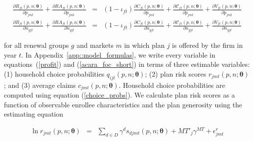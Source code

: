 \documentclass[12pt]{article}
\begin{document}
\vspace{-0.4in}	
\begin{footnotesize}

	\begin{eqnarray}\label{acara_foc_short}
	\frac{\partial R_{ft}(\textit{p},\textit{n};\boldsymbol{\theta})}{\partial p_{jmt}} + \frac{\partial RA_{ft}(\textit{p},\textit{n};\boldsymbol{\theta})}{\partial p_{jmt}} &=& (1-\iota_{ft}) \frac{\partial C_{ft}(\textit{p},\textit{n};\boldsymbol{\theta})}{\partial p_{jmt}} + \frac{\partial \mathcal{C}_{ft}(\textit{p},\textit{n};\boldsymbol{\theta})}{\partial p_{jmt}} + \frac{\partial V_{ft}(\textit{p},\textit{n};\boldsymbol{\theta})}{\partial p_{jmt}} \nonumber \\
	\frac{\partial R_{ft}(\textit{p},\textit{n};\boldsymbol{\theta})}{\partial n_{gjt}} + \frac{\partial RA_{ft}(\textit{p},\textit{n};\boldsymbol{\theta})}{\partial n_{gjt}} &=& (1-\iota_{ft}) \frac{\partial C_{ft}(\textit{p},\textit{n};\boldsymbol{\theta})}{\partial n_{gjt}} + \frac{\partial \mathcal{C}_{ft}(\textit{p},\textit{n};\boldsymbol{\theta})}{\partial n_{gjt}} + \frac{\partial V_{ft}(\textit{p},\textit{n};\boldsymbol{\theta})}{\partial n_{gjt}}
	\end{eqnarray}

\end{footnotesize}

	\vspace{-0.1in}	

\noindent for all renewal groups $g$ and markets $m$ in which plan $j$ is offered by the firm in year $t$. In Appendix~\ref{app::model_formulas}, we write every variable in equations~(\ref{profit}) and (\ref{acara_foc_short})  in terms of three estimable variables: (1) household choice probabilities $q_{ijt}(\textit{p},\textit{n};\boldsymbol{\theta})$; (2) plan risk scores $r_{jmt}(\textit{p},\textit{n};\boldsymbol{\theta})$; and (3) average claims $c_{jmt}(\textit{p},\textit{n};\boldsymbol{\theta})$.  Household choice probabilities are computed using equation (\ref{choice_probs}).  We calculate plan risk scores as a function of observable enrollee characteristics   and the plan generosity using the estimating equation  


\vspace{-0.4in}

	\begin{eqnarray}\label{risk_score_estimation}
	\ln r_{jmt}(\textit{p},\textit{n};\boldsymbol{\theta}) &=& \sum_{d \in D} \gamma^d s_{djmt}(\textit{p},\textit{n};\boldsymbol{\theta}) + MT'_j \gamma^{MT} + \epsilon_{jmt}^r
	\end{eqnarray}
\end{document}
